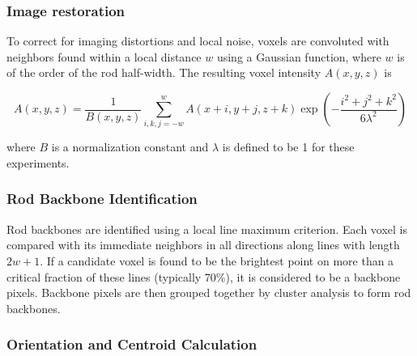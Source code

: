 \subsubsection{Image restoration}

To correct for imaging distortions and local noise, voxels are convoluted with neighbors found within a local
distance $w$ using a Gaussian function, where $w$ is of the order of the rod half-width. The resulting
voxel intensity $A(x,y,z)$ is

\begin{center}
\begin{equation}
A(x,y,z) = \frac{1}{B(x,y,z)} \sum_{i,k,j=-w}^w A(x+i,y+j,z+k) 
\exp{ \left( -\frac{i^2+j^2+k^2}{6\lambda^2} \right)}
\end{equation}
\end{center}

where $B$ is a normalization constant and $\lambda$ is defined to be 1 for these experiments.

\subsubsection{Rod Backbone Identification}


Rod backbones are identified using a local line maximum criterion.  Each voxel is compared with its immediate 
neighbors in all directions along lines with length $2w+1$.  If a candidate voxel is found to be the brightest
point on more than a critical fraction of these lines (typically 70\%), it is considered to be a backbone
pixels.  Backbone pixels are then grouped together by cluster analysis to form rod backbones.


\subsubsection{Orientation and Centroid Calculation}
\label{sec:orient-calculate}


